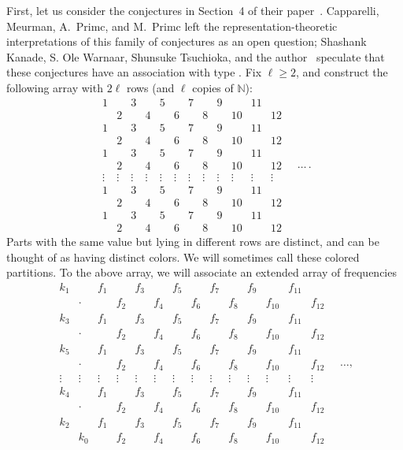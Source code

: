 \documentclass[pdftex]{sigma}
\numberwithin{equation}{section}
\theoremstyle{definition}
\newcommand{\NN}{\mathbb{N}}
\begin{document}
First, let us consider the conjectures in Section~4 of their paper~\cite{CMPP}. Capparelli, Meurman, A.~Primc, and M.~Primc left the representation-theoretic interpretations of this family of conjectures as an open question; Shashank Kanade, S. Ole Warnaar, Shunsuke Tsuchioka, and the author~\cite{KRTW} speculate that these conjectures have an association with type . Fix $\ell\ge 2$, and construct the following array with $2\ell$ rows (and $\ell$ copies of $\NN$):
\begin{equation*}
\begin{matrix}
1 && 3 && 5 && 7 && 9 && 11 & \\
& 2 && 4 && 6 && 8 && 10 && 12\\
1 && 3 && 5 && 7 && 9 && 11 & \\
& 2 && 4 && 6 && 8 && 10 && 12\\
1 && 3 && 5 && 7 && 9 && 11 & \\
& 2 && 4 && 6 && 8 && 10 && 12\\
\vdots & \vdots &\vdots& \vdots &\vdots& \vdots &\vdots& \vdots &\vdots& \vdots &\vdots& \vdots\\
1 && 3 && 5 && 7 && 9 && 11 & \\
& 2 && 4 && 6 && 8 && 10 && 12\\
1 && 3 && 5 && 7 && 9 && 11 & \\
& 2 && 4 && 6 && 8 && 10 && 12
 \end{matrix}\quad\dots\,.
\end{equation*}
Parts with the same value but lying in different rows are distinct, and can be thought of as having distinct colors. We will sometimes call these colored partitions.
To the above array, we will associate an extended array of frequencies
\begin{equation*}
\begin{matrix}
k_1 && f_1 && f_3 && f_5 && f_7 && f_9 && f_{11} & \\
& \cdot && f_2 && f_4 && f_6 && f_8 && f_{10} && f_{12}\\
k_3 &&f_1 && f_3 && f_5 && f_7 && f_9 && f_{11} & \\
& \cdot && f_2 && f_4 && f_6 && f_8 && f_{10} && f_{12}\\
k_5 &&f_1 && f_3 && f_5 && f_7 && f_9 && f_{11} & \\
& \cdot && f_2 && f_4 && f_6 && f_8 && f_{10} && f_{12}\\
\vdots & \vdots &\vdots& \vdots &\vdots& \vdots &\vdots& \vdots &\vdots& \vdots &\vdots& \vdots&\vdots& \vdots\\
k_4 && f_1 && f_3 && f_5 && f_7 && f_9 && f_{11} & \\
& \cdot && f_2 && f_4 && f_6 && f_8 && f_{10} && f_{12} \\
k_2 && f_1 && f_3 && f_5 && f_7 && f_9 && f_{11} & \\
& k_0 && f_2 && f_4 && f_6 && f_8 && f_{10} && f_{12}
 \end{matrix}\quad\dots,
\end{equation*}
\end{document}
